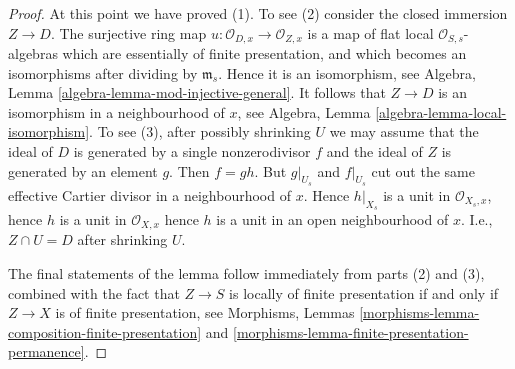 \begin{proof}
\medskip\noindent
At this point we have proved (1). To see (2) consider the closed
immersion $Z \to D$. The surjective ring map
$u : \mathcal{O}_{D, x} \to \mathcal{O}_{Z, x}$
is a map of flat local $\mathcal{O}_{S, s}$-algebras which
are essentially of finite presentation, and which becomes an
isomorphisms after dividing by $\mathfrak m_s$. Hence it is
an isomorphism, see
Algebra, Lemma \ref{algebra-lemma-mod-injective-general}.
It follows that $Z \to D$ is an isomorphism in a neighbourhood
of $x$, see
Algebra, Lemma \ref{algebra-lemma-local-isomorphism}.
To see (3), after possibly shrinking $U$ we may assume that
the ideal of $D$ is generated by a single nonzerodivisor $f$
and the ideal of $Z$ is generated by an element $g$. Then
$f = gh$. But $g|_{U_s}$ and $f|_{U_s}$ cut out the same
effective Cartier divisor in a neighbourhood of $x$. Hence
$h|_{X_s}$ is a unit in $\mathcal{O}_{X_s, x}$, hence $h$ is
a unit in $\mathcal{O}_{X, x}$ hence $h$ is a unit in an
open neighbourhood of $x$. I.e., $Z \cap U = D$ after shrinking $U$.

\medskip\noindent
The final statements of the lemma follow immediately from
parts (2) and (3), combined with the fact that $Z \to S$
is locally of finite presentation if and only if $Z \to X$ is
of finite presentation, see
Morphisms, Lemmas \ref{morphisms-lemma-composition-finite-presentation} and
\ref{morphisms-lemma-finite-presentation-permanence}.
\end{proof}



